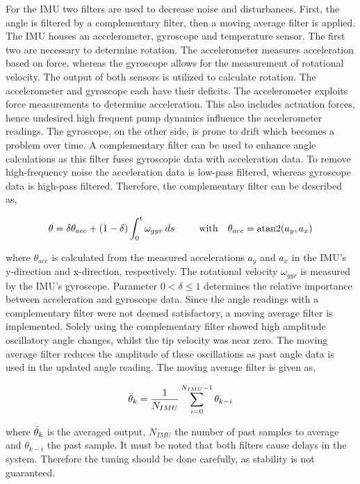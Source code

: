 For the IMU two filters are used to decrease noise and disturbances. First, the angle is filtered by a complementary filter, then a moving average filter is applied. The IMU houses an accelerometer, gyroscope and temperature sensor. The first two are necessary to determine rotation. The accelerometer measures acceleration based on force, whereas the gyroscope allows for the measurement of rotational velocity. The output of both sensors is utilized to calculate rotation. The accelerometer and gyroscope each have their deficits. The accelerometer exploits force measurements to determine acceleration. This also includes actuation forces, hence undesired high frequent pump dynamics influence the accelerometer readings. The gyroscope, on the other side, is prone to drift which becomes a problem over time. A complementary filter can be used to enhance angle calculations as this filter fuses gyroscopic data with acceleration data. To remove high-frequency noise the acceleration data is low-pass filtered, whereas gyroscope data is high-pass filtered. Therefore, the complementary filter can be described as, 

\begin{equation}
    \theta = \delta \theta_{acc} + (1-\delta) \int_0^t \omega_{gyr} \hspace{2pt} ds    \hspace{25pt} \text{with}  \hspace{10pt} \theta_{acc} = \operatorname{atan2}(a_y,a_x)
\end{equation}

where $\theta_{acc}$ is calculated from the measured accelerations $a_y$ and $a_x$ in the IMU's y-direction and x-direction, respectively. The rotational velocity $\omega_{gyr}$ is measured by the IMU's gyroscope. Parameter $0 < \delta \leq 1$ determines the relative importance between acceleration and gyroscope data. Since the angle readings with a complementary filter were not deemed satisfactory, a moving average filter is implemented. Solely using the complementary filter showed high amplitude oscillatory angle changes, whilst the tip velocity was near zero. The moving average filter reduces the amplitude of these oscillations as past angle data is used in the updated angle reading. The moving average filter is given as,

\begin{equation}
    \Bar{\theta}_k = \frac{1}{N_{IMU}}\sum_{i = 0} ^ {N_{IMU}-1} \theta_{k-i}
\end{equation}

where $\Bar{\theta}_k$ is the averaged output, $N_{IMU}$ the number of past samples to average and $\theta_{k-i}$ the past sample. It must be noted that both filters cause delays in the system. Therefore the tuning should be done carefully, as stability is not guaranteed.


